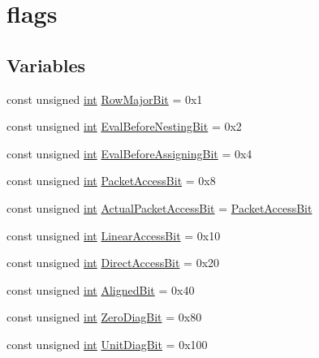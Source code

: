 \hypertarget{group__flags}{\section{flags}
\label{group__flags}
}
\subsection*{Variables}
\begin{DoxyCompactItemize}
\item 
const unsigned \hyperlink{ioapi_8h_a787fa3cf048117ba7123753c1e74fcd6}{int} \hyperlink{group__flags_ga7bd49e7b260e869e10fb9dc4fd081a85}{Row\-Major\-Bit} = 0x1
\item 
const unsigned \hyperlink{ioapi_8h_a787fa3cf048117ba7123753c1e74fcd6}{int} \hyperlink{group__flags_gaf8ad6e2956f7368b8e3f7407e2319e63}{Eval\-Before\-Nesting\-Bit} = 0x2
\item 
const unsigned \hyperlink{ioapi_8h_a787fa3cf048117ba7123753c1e74fcd6}{int} \hyperlink{group__flags_gadc8925e67a5a54bd479d6f587112e19a}{Eval\-Before\-Assigning\-Bit} = 0x4
\item 
const unsigned \hyperlink{ioapi_8h_a787fa3cf048117ba7123753c1e74fcd6}{int} \hyperlink{group__flags_gaa780614dc11271c147db56e9c1524e76}{Packet\-Access\-Bit} = 0x8
\item 
const unsigned \hyperlink{ioapi_8h_a787fa3cf048117ba7123753c1e74fcd6}{int} \hyperlink{group__flags_gaafbee24aed0aa204db61f7fce3334329}{Actual\-Packet\-Access\-Bit} = \hyperlink{group__flags_gaa780614dc11271c147db56e9c1524e76}{Packet\-Access\-Bit}
\item 
const unsigned \hyperlink{ioapi_8h_a787fa3cf048117ba7123753c1e74fcd6}{int} \hyperlink{group__flags_gab9799bf6feed77fc9fce0136ee55b99c}{Linear\-Access\-Bit} = 0x10
\item 
const unsigned \hyperlink{ioapi_8h_a787fa3cf048117ba7123753c1e74fcd6}{int} \hyperlink{group__flags_ga54c3b872f5a14e7e0d3d6539b704ea67}{Direct\-Access\-Bit} = 0x20
\item 
const unsigned \hyperlink{ioapi_8h_a787fa3cf048117ba7123753c1e74fcd6}{int} \hyperlink{group__flags_ga972a2dcb6603215fa53e0b9e82051426}{Aligned\-Bit} = 0x40
\item 
const unsigned \hyperlink{ioapi_8h_a787fa3cf048117ba7123753c1e74fcd6}{int} \hyperlink{group__flags_gab59e11ef20fc97c063991fc318d2d074}{Zero\-Diag\-Bit} = 0x80
\item 
const unsigned \hyperlink{ioapi_8h_a787fa3cf048117ba7123753c1e74fcd6}{int} \hyperlink{group__flags_ga254555b50eae5fa8a8d241f6bc08939a}{Unit\-Diag\-Bit} = 0x100

\end{DoxyCompactItemize}

